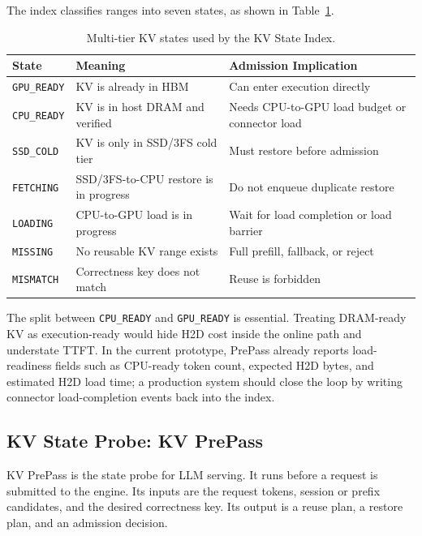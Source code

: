 \documentclass[sigconf,review,anonymous]{acmart}
\begin{document}
The index classifies ranges into seven states, as shown in
Table~\ref{tab:states}.

\begin{table}[t]
  \centering
  \caption{Multi-tier KV states used by the KV State Index.}
  \label{tab:states}
  \begin{tabular}{lll}
    \toprule
    State & Meaning & Admission Implication \\
    \midrule
    \texttt{GPU\_READY} & KV is already in HBM & Can enter execution directly \\
    \texttt{CPU\_READY} & KV is in host DRAM and verified & Needs CPU-to-GPU load budget or connector load \\
    \texttt{SSD\_COLD} & KV is only in SSD/3FS cold tier & Must restore before admission \\
    \texttt{FETCHING} & SSD/3FS-to-CPU restore is in progress & Do not enqueue duplicate restore \\
    \texttt{LOADING} & CPU-to-GPU load is in progress & Wait for load completion or load barrier \\
    \texttt{MISSING} & No reusable KV range exists & Full prefill, fallback, or reject \\
    \texttt{MISMATCH} & Correctness key does not match & Reuse is forbidden \\
    \bottomrule
  \end{tabular}
\end{table}

The split between \texttt{CPU\_READY} and \texttt{GPU\_READY} is essential.
Treating DRAM-ready KV as execution-ready would hide H2D cost inside the online
path and understate TTFT. In the current prototype, PrePass already reports
load-readiness fields such as CPU-ready token count, expected H2D bytes, and
estimated H2D load time; a production system should close the loop by writing
connector load-completion events back into the index.

\subsection{KV State Probe: KV PrePass}

KV PrePass is the state probe for LLM serving. It runs before a request is
submitted to the engine. Its inputs are the request tokens, session or prefix
candidates, and the desired correctness key. Its output is a reuse plan, a
restore plan, and an admission decision.
\end{document}
